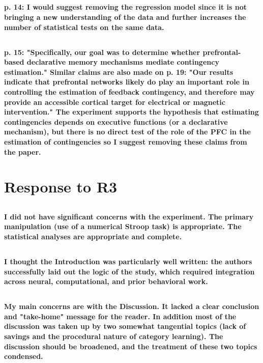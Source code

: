 \documentclass[10pt,a4paper]{article} \usepackage{amsmath} \usepackage{parskip}
\begin{document}
\subsection{} \textbf{
  p. 14: I would suggest removing the regression model since it is not bringing a
  new understanding of the data and further increases the number of statistical
  tests on the same data.
}

\subsection{} \textbf{
  p. 15: "Specifically, our goal was to determine whether prefrontal-based
  declarative memory mechanisms mediate contingency estimation." Similar claims
  are also made on p. 19: "Our results indicate that prefrontal networks likely do
  play an important role in controlling the estimation of feedback contingency,
  and therefore may provide an accessible cortical target for electrical or
  magnetic intervention." The experiment supports the hypothesis that estimating
  contingencies depends on executive functions (or a declarative mechanism), but
  there is no direct test of the role of the PFC in the estimation of
  contingencies so I suggest removing these claims from the paper.
}

\section{Response to R3}

\subsection{} \textbf{
  I did not have significant concerns with the experiment. The primary
  manipulation (use of a numerical Stroop task) is appropriate. The statistical
  analyses are appropriate and complete.
}

\subsection{} \textbf{
  I thought the Introduction was particularly well written: the authors
  successfully laid out the logic of the study, which required integration across
  neural, computational, and prior behavioral work.
}

\subsection{} \textbf{
  My main concerns are with the Discussion. It lacked a clear conclusion and
  "take-home" message for the reader. In addition most of the discussion was taken
  up by two somewhat tangential topics (lack of savings and the procedural nature
  of category learning). The discussion should be broadened, and the treatment of
  these two topics condensed.
}



\end{document}
